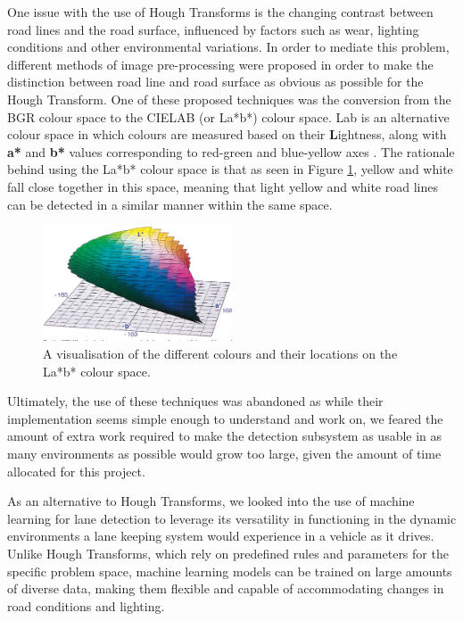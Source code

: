 \documentclass[titlepage]{article}
\begin{document}
One issue with the use of Hough Transforms is the changing contrast between road lines and the road surface, influenced by
factors such as wear, lighting conditions and other environmental variations.
In order to mediate this problem, different methods of image pre-processing were proposed in order to make the distinction
between road line and road surface as obvious as possible for the Hough Transform.
One of these proposed techniques was the conversion from the BGR colour space to the CIELAB (or La*b*) colour space.
La\*b\* is an alternative colour space in which colours are measured based on their \textbf{L}ightness, along with \textbf{a*} and
\textbf{b*} values corresponding to red-green and blue-yellow axes \cite{Mclaren2008}.
The rationale behind using the La*b* colour space is that as seen in Figure \ref{LabColourSpace}, yellow and white fall close
together in this space, meaning that light yellow and white road lines can be detected in a similar manner within the same space.

\begin{figure}
	\centering
	\includegraphics[width=0.5\textwidth]{Lab-colour-space}
	\caption{A visualisation of the different colours and their locations on the La*b* colour space.}
	\label{LabColourSpace}
\end{figure}

Ultimately, the use of these techniques was abandoned as while their implementation seems simple enough to understand and work
on, we feared the amount of extra work required to make the detection subsystem as usable in as many environments as possible
would grow too large, given the amount of time allocated for this project.

As an alternative to Hough Transforms, we looked into the use of machine learning for lane detection to leverage its versatility
in functioning in the dynamic environments a lane keeping system would experience in a vehicle as it drives.
Unlike Hough Transforms, which rely on predefined rules and parameters for the specific problem space, machine learning models
can be trained on large amounts of diverse data, making them flexible and capable of accommodating changes in road conditions
and lighting.
\end{document}
